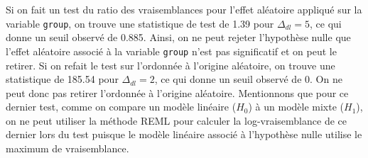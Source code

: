\documentclass{article}
\begin{document}
	Si on fait un test du ratio des vraisemblances pour l'effet aléatoire appliqué sur la variable \texttt{group}, on trouve une statistique de test de 1.39 pour $\Delta_{dl}=5$, ce qui donne un seuil observé de 0.885. Ainsi, on ne peut rejeter l'hypothèse nulle que l'effet aléatoire associé à la variable \texttt{group} n'est pas significatif et on peut le retirer. Si on refait le test sur l'ordonnée à l'origine aléatoire, on trouve une statistique de 185.54 pour $\Delta_{dl}=2$, ce qui donne un seuil observé de 0. On ne peut donc pas retirer l'ordonnée à l'origine aléatoire. Mentionnons que pour ce dernier test, comme on compare un modèle linéaire ($H_0$) à un modèle mixte ($H_1$), on ne peut utiliser la méthode REML pour calculer la log-vraisemblance de ce dernier lors du test puisque le modèle linéaire associé à l'hypothèse nulle utilise le maximum de vraisemblance.\\
	
\end{document}
